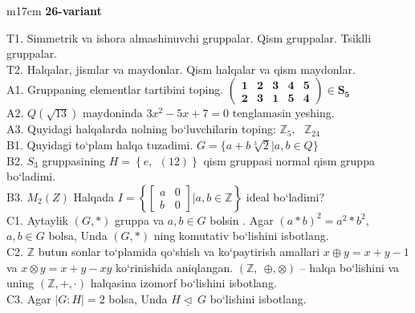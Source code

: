 \documentclass{article}
\begin{document}
\begin{tabular}{m{17cm}}
\textbf{26-variant}
\newline

T1. Simmetrik va ishora almashinuvchi gruppalar. Qism gruppalar. Tsiklli gruppalar. \\
T2. Halqalar, jismlar va maydonlar. Qism halqalar va qism maydonlar. \\
A1. Gruppaning elementlar tartibini toping. \(\begin{pmatrix}
\mathbf{1} & \mathbf{2} & \mathbf{3} & \mathbf{4} & \mathbf{5} \\
\mathbf{2} & \mathbf{3} & \mathbf{1} & \mathbf{5} & \mathbf{4}
\end{pmatrix}\mathbf{\in}\mathbf{S}_{\mathbf{5}}\) \\
A2. \(Q(\sqrt{13})\) maydoninda \(3x^{2} - 5x + 7 = 0\) tenglamasin yeshing. \\
A3. Quyidagi halqalarda nolning bo`luvchilarin toping: \(\mathbb{Z}_{5},\ \ \ \mathbb{Z}_{24}\) \\
B1. Quyidagi to`plam halqa tuzadimi. \(G = \{ a + b\sqrt[3]{2}|a,b \in Q\}\) \\
B2. \(S_{3}\) gruppasining \(H = \left\{ e,\ \ (12) \right\}\) qism gruppasi normal qism gruppa bo`ladimi. \\
B3. \(M_{2}(Z)\) Halqada \(I = \left\{ \begin{bmatrix}
a & 0 \\
b & 0
\end{bmatrix}|a,b\mathbb{\in Z} \right\}\) ideal bo`ladimi? \\
C1. Aytaylik \((G,*)\) gruppa va \(a,b \in G\) bo\textquotesingle lsin . Agar \((a*b)^{2} = a^{2}*b^{2}\), \(a,b \in G\) bolsa, Unda \((G,*)\) ning komutativ bo`lishini isbotlang. \\
C2. \(\mathbb{Z}\) butun sonlar to`plamida qo`shish va ko`paytirish amallari \(x \oplus y = x + y - 1\) va \(x \otimes y = x + y - xy\) ko`rinishida aniqlangan. \((\mathbb{Z},\ \  \oplus , \otimes )\) -- halqa bo`lishini va uning \((\mathbb{Z}, + , \cdot )\) halqasina izomorf bo`lishini isbotlang. \\
C3. Agar \(|G:H| = 2\) bolsa, Unda \(H\underline{\vartriangleleft}\ G\) bo`lishini isbotlang. \\

\end{tabular}
\vspace{1cm}
\end{document}
